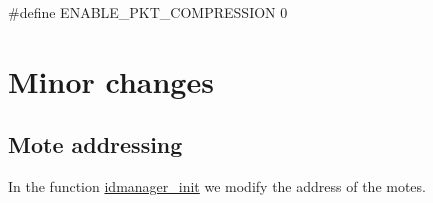 \begin{DoxyCodeInclude}
\end{DoxyCodeInclude}
 
\begin{DoxyCodeInclude}
\textcolor{preprocessor}{#define ENABLE\_PKT\_COMPRESSION 0}
\end{DoxyCodeInclude}
 

 \hypertarget{_l_k_n_contribution_Minor_changes}{}\section{Minor changes}\label{_l_k_n_contribution_Minor_changes}
\hypertarget{_l_k_n_contribution_Addr_edits}{}\subsection{Mote addressing}\label{_l_k_n_contribution_Addr_edits}
In the function \hyperlink{group___i_d_manager_ga3e974443ae75269d00c3de03992a1669}{idmanager\+\_\+init} we modify the address of the motes.

